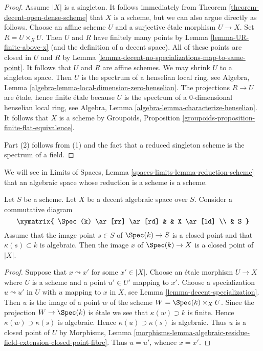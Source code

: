 \begin{proof}
Assume $|X|$ is a singleton. It follows immediately from
Theorem \ref{theorem-decent-open-dense-scheme} that $X$ is a scheme,
but we can also argue directly as follows.
Choose an affine scheme $U$ and a surjective \'etale morphism $U \to X$.
Set $R = U \times_X U$. Then $U$ and $R$ have finitely many points by
Lemma \ref{lemma-UR-finite-above-x} (and the definition of a decent space).
All of these points are closed in $U$ and $R$ by
Lemma \ref{lemma-decent-no-specializations-map-to-same-point}.
It follows that $U$ and $R$ are affine schemes.
We may shrink $U$ to a singleton space. Then $U$ is
the spectrum of a henselian local ring, see
Algebra, Lemma \ref{algebra-lemma-local-dimension-zero-henselian}.
The projections $R \to U$ are \'etale, hence finite \'etale because
$U$ is the spectrum of a $0$-dimensional henselian local ring, see
Algebra, Lemma \ref{algebra-lemma-characterize-henselian}.
It follows that $X$ is a scheme by
Groupoids, Proposition \ref{groupoids-proposition-finite-flat-equivalence}.

\medskip\noindent
Part (2) follows from (1) and the fact that a reduced singleton
scheme is the spectrum of a field.
\end{proof}

\begin{remark}
\label{remark-one-point-decent-scheme}
We will see in
Limits of Spaces, Lemma \ref{spaces-limits-lemma-reduction-scheme}
that an algebraic space
whose reduction is a scheme is a scheme.
\end{remark}

\begin{lemma}
\label{lemma-algebraic-residue-field-extension-closed-point}
Let $S$ be a scheme. Let $X$ be a decent algebraic space over $S$.
Consider a commutative diagram
$$
\xymatrix{
\Spec(k) \ar[rr] \ar[rd] & & X \ar[ld] \\
& S
}
$$
Assume that the image point $s \in S$ of $\Spec(k) \to S$ is
a closed point and that $\kappa(s) \subset k$ is algebraic.
Then the image $x$ of $\Spec(k) \to X$ is a closed point of $|X|$.
\end{lemma}

\begin{proof}
Suppose that $x \leadsto x'$ for some $x' \in |X|$. Choose an
\'etale morphism $U \to X$ where $U$ is a scheme and a point $u' \in U'$
mapping to $x'$. Choose a specialization $u \leadsto u'$ in $U$ with $u$
mapping to $x$ in $X$, see Lemma \ref{lemma-decent-specialization}.
Then $u$ is the image of a point $w$ of the scheme
$W = \Spec(k) \times_X U$. Since the projection $W \to \Spec(k)$ is \'etale
we see that $\kappa(w) \supset k$ is finite. Hence
$\kappa(w) \supset \kappa(s)$ is algebraic. Hence $\kappa(u) \supset \kappa(s)$
is algebraic. Thus $u$ is a closed point of $U$ by
Morphisms, Lemma
\ref{morphisms-lemma-algebraic-residue-field-extension-closed-point-fibre}.
Thus $u = u'$, whence $x = x'$.
\end{proof}

